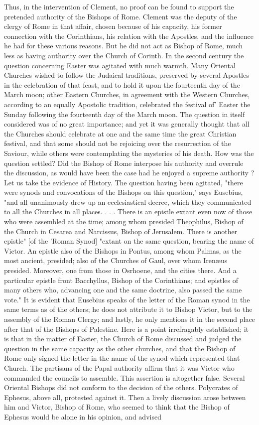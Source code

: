 Thus, in the intervention of Clement, no proof can be found to support the pretended authority of the Bishops of Rome. Clement was the deputy of the clergy of Rome in that affair, chosen because of his capacity, his former connection with the Corinthians, his relation with the Apostles, and the influence he had for these various reasons. But he did not act as Bishop of Rome, much less as having authority over the Church of Corinth. In the second century the question concerning Easter was agitated with much warmth. Many Oriental Churches wished to follow the Judaical traditions, preserved by several Apostles in the celebration of that feast, and to hold it upon the fourteenth day of the March moon; other Eastern Churches, in agreement with the Western Churches, according to an equally Apostolic tradition, celebrated the festival of' Easter the Sunday following the fourteenth day of the March moon. The question in itself considered was of no great importance; and yet it was generally thought that all the Churches should celebrate at one and the same time the great Christian festival, and that some should not be rejoicing over the resurrection of the Saviour, while others were contemplating the mysteries of his death. How was the question settled? Did the Bishop of Rome interpose his authority and overrule the discussion, as would have been the case had he enjoyed a supreme authority ? Let us take the evidence of History. The question having been agitated, "there were synods and convocations of the Bishops on this question," says Eusebius, "and all unanimously drew up an ecclesiastical decree, which they communicated to all the Churches in all places. . . . There is an epistle extant even now of those who were assembled at the time; among whom presided Theophilus, Bishop of the Church in Cesarea and Narcissus, Bishop of Jerusalem. There is another epistle" [of the 'Roman Synod] "extant on the same question, bearing the name of Victor. An epistle also of the Bishops in Pontus, among whom Palmas, as the most ancient, presided; also of the Churches of Gaul, over whom Irenæus presided. Moreover, one from those in Osrhoene, and the cities there. And a particular epistle front Bacchyllus, Bishop of the Corinthians; and epistles of many others who, advancing one and the same doctrine, also passed the same vote." It is evident that Eusebius speaks of the letter of the Roman synod in the same terms as of the others; he does not attribute it to Bishop Victor, but to the assembly of the Roman Clergy; and lastly, he only mentions it in the second place after that of the Bishops of Palestine. Here is a point irrefragably established; it is that in the matter of Easter, the Church of Rome discussed and judged the question in the same capacity as the other churches, and that the Bishop of Rome only signed the letter in the name of the synod which represented that Church. The partisans of the Papal authority affirm that it was Victor who commanded the councils to assemble. This assertion is altogether false. Several Oriental Bishops did not conform to the decision of the others. Polycrates of Ephesus, above all, protested against it. Then a lively discussion arose between him and Victor, Bishop of Rome, who seemed to think that the Bishop of Ephesus would be alone in his opinion, and advised 